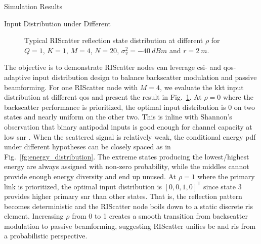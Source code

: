 \begin{section}{Simulation Results}
	\begin{subsection}{Input Distribution under Different }
		\begin{figure}[H]
			\centering
			\resizebox{0.65\columnwidth}{!}{
				
			}
			\caption{Typical RIScatter reflection state distribution at different $\rho$ for $Q=1$, $K=1$, $M=4$, $N=20$, $\sigma_v^2=\qty{-40}{dBm}$ and $r=\qty{2}{m}$.}
			\label{fg:distribution_weights}
		\end{figure}
		The objective is to demonstrate RIScatter nodes can leverage \gls{csi}- and \gls{qos}-adaptive input distribution design to balance backscatter modulation and passive beamforming.
		For one RIScatter node with $M=4$, we evaluate the \gls{kkt} input distribution at different \gls{qos} and present the result in Fig.~\ref{fg:distribution_weights}.
		At $\rho=0$ where the backscatter performance is prioritized, the optimal input distribution is \num{0} on two states and nearly uniform on the other two.
		This is inline with Shannon's observation that binary antipodal inputs is good enough for channel capacity at low \gls{snr} \cite{Shannon1948}.
		When the scattered signal is relatively weak, the conditional energy \gls{pdf} under different hypotheses can be closely spaced as in Fig.~\ref{fg:energy_distribution}.
		The extreme states producing the lowest/highest energy are always assigned with non-zero probability, while the middles cannot provide enough energy diversity and end up unused.
		At $\rho=1$ where the primary link is prioritized, the optimal input distribution is $[0, 0, 1, 0]^\mathsf{T}$ since state 3 provides higher primary \gls{snr} than other states.
		That is, the reflection pattern becomes deterministic and the RIScatter node boils down to a static discrete \gls{ris} element.
		Increasing $\rho$ from \num{0} to \num{1} creates a smooth transition from backscatter modulation to passive beamforming, suggesting RIScatter unifies \gls{bc} and \gls{ris} from a probabilistic perspective.
	\end{subsection}


\end{section}
